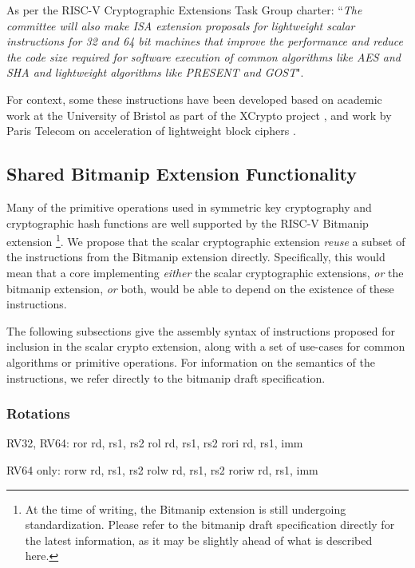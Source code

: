 
As per the RISC-V Cryptographic Extensions Task Group charter:
``{\em The committee will also make ISA extension proposals for lightweight
scalar instructions for 32 and 64 bit machines that improve the performance
and reduce the code size required for software execution of common algorithms
like AES and SHA and lightweight algorithms like PRESENT and GOST}".

\bigskip

For context, some these instructions have been developed based on academic
work at the University of Bristol as part of the XCrypto project
\cite{MPP:19},
and work by
Paris Telecom on acceleration of lightweight block ciphers
\cite{TGMGD:19}.


\subsection{Shared Bitmanip Extension Functionality}

Many of the primitive operations used in symmetric key cryptography
and cryptographic hash functions are well supported by the
RISC-V Bitmanip \cite{riscv:bitmanip:repo} extension
\footnote{
At the time of writing, the Bitmanip extension is still undergoing
standardization.
Please refer to the bitmanip draft specification
\cite{riscv:bitmanip:draft}
directly for the
latest information, as it may be slightly ahead of what is described
here.
}.
We propose that the scalar cryptographic extension {\em reuse} a
subset of the instructions from the Bitmanip extension directly.
Specifically, this would mean that
a core implementing
{\em either}
the scalar cryptographic extensions,
{\em or}
the bitmanip extension,
{\em or}
both,
would be able to depend on the existence of these instructions.

The following subsections give the assembly syntax of instructions
proposed for inclusion in the scalar crypto extension, along with a
set of use-cases for common algorithms or primitive operations.
For information on the semantics of the instructions, we refer directly
to the bitmanip draft specification.

\subsubsection{Rotations}

\begin{isa}
RV32, RV64:
    ror    rd, rs1, rs2
    rol    rd, rs1, rs2
    rori   rd, rs1, imm

RV64 only:
    rorw   rd, rs1, rs2
    rolw   rd, rs1, rs2
    roriw  rd, rs1, imm
\end{isa}

